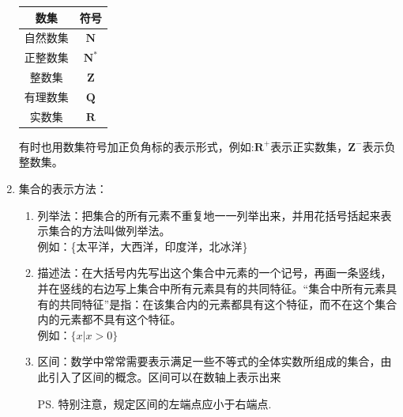 \begin{enumerate}
\begin{center}
{\begin{tabular}{cc}
                 数集& 符号 \\
            \hline
                 自然数集& $\mathbf{N}$ \\
                 正整数集& $\mathbf{N}^*$\\
                 整数集& $\mathbf{Z}$\\
                 有理数集& $\mathbf{Q}$\\
                 实数集& $\mathbf{R}$\\
             \hline
            \end{tabular}
            }
            \end{center}
            有时也用数集符号加正负角标的表示形式，例如:$\mathbf{R^+}$表示正实数集，$\mathbf{Z^-}$表示负整数集。
        \item 集合的表示方法：
            \begin{enumerate}
            \item 列举法：把集合的所有元素不重复地一一列举出来，并用花括号括起来表示集合的方法叫做列举法。\\
            例如：\{太平洋，大西洋，印度洋，北冰洋\}
            \item 描述法：在大括号内先写出这个集合中元素的一个记号，再画一条竖线，并在竖线的右边写上集合中所有元素具有的共同特征。“集合中所有元素具有的共同特征”是指：在该集合内的元素都具有这个特征，而不在这个集合内的元素都不具有这个特征。\\
            例如：$\{x|x>0\}$
            \item 区间：数学中常常需要表示满足一些不等式的全体实数所组成的集合，由此引入了区间的概念。区间可以在数轴上表示出来
                \ps 特别注意，规定区间的左端点应小于右端点.

\end{enumerate}
\end{enumerate}
